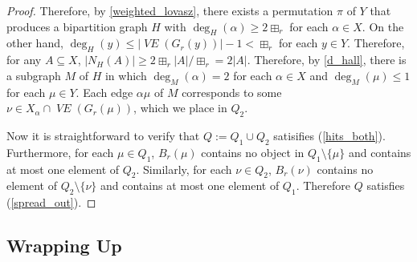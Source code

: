 \documentclass{patmorin}
\newcommand{\vol}[1]{\boxplus_{#1}}
\DeclareMathOperator{\VE}{\mathit{VE}}
\begin{document}
\begin{proof}

  Therefore, by \cref{weighted_lovasz}, there exists a permutation $\pi$ of $Y$ that produces a bipartition graph $H$ with $\deg_H(\alpha)\ge {2\vol{r}}$ for each $\alpha\in X$.  On the other hand, $\deg_{H}(y)\le |\VE(G_r(y))|-1 < {\vol{r}}$ for each $y\in Y$.  Therefore, for any $A\subseteq X$, $|N_H(A)|\ge {2\vol{r}}|A|/{\vol{r}} = 2|A|$.  Therefore, by \cref{d_hall}, there is a subgraph $M$ of $H$ in which $\deg_M(\alpha)=2$ for each $\alpha\in X$ and $\deg_M(\mu)\le 1$ for each $\mu\in Y$. Each edge $\alpha\mu$ of $M$ corresponds to some $\nu\in X_\alpha\cap\VE(G_r(\mu))$, which we place in $Q_2$.

  Now it is straightforward to verify that $Q:=Q_1\cup Q_2$ satisifies (\ref{hits_both}).  Furthermore, for each $\mu\in Q_1$, $B_r(\mu)$ contains no object in $Q_1\setminus\{\mu\}$ and contains at most one element of $Q_2$.  Similarly, for each $\nu\in Q_2$, $B_r(\nu)$ contains no element of $Q_2\setminus\{\nu\}$ and contains at most one element of $Q_1$.  Therefore $Q$ satisfies (\ref{spread_out}).
\end{proof}

\subsection{Wrapping Up}
\label{wrapping_up}
\end{document}
